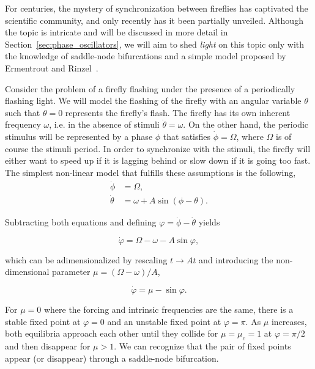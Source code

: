 \begin{exmp}
    For centuries, the mystery of synchronization between fireflies has
    captivated the scientific community, and only recently has it been
    partially unveiled. Although the topic is intricate and will be discussed
    in more detail in Section~\ref{sec:phase_oscillators},
    we will aim to shed {\em light} on this topic only with the knowledge of saddle-node bifurcations
    and a simple model proposed by Ermentrout and Rinzel~\cite{ermentrout1984beyond}. 
    
    Consider the problem
    of a firefly flashing under the presence of a periodically flashing light.
    We will model the flashing of the firefly with an angular variable $\theta$
    such that $\theta = 0$ represents the firefly's flash. The firefly has its 
    own inherent frequency $\omega$, i.e. in the absence of stimuli 
    $\dot{\theta} = \omega$. On the other hand, the periodic stimulus will be
    represented by a phase $\phi$ that satisfies $\dot{\phi} = \Omega$, where 
    $\Omega$ is of course the stimuli period. In order to synchronize with the
    stimuli, the firefly will either want to speed up if it is lagging behind
    or slow down if it is going too fast. The simplest non-linear model that
    fulfills these assumptions is the following,
    \begin{align*}
        \dot{\phi} &= \Omega, \\
        \dot{\theta} &= \omega + A \sin(\phi -  \theta).
    \end{align*}

    Subtracting both equations and defining $\varphi = \dot{\phi} - \dot{\theta}$
    yields 

    \begin{equation*}
        \dot{\varphi} = \Omega - \omega - A \sin \varphi,
    \end{equation*}

    \noindent which can be adimensionalized by rescaling $t \to At$ and introducing
    the non-dimensional parameter $\mu = (\Omega - \omega)/A$,

    \begin{equation}
        \dot{\varphi} = \mu - \sin \varphi.
        \label{eq:pre_bif_sn_exmp}
    \end{equation}

    For $\mu = 0$ where the forcing and intrinsic frequencies are the same, there
    is a stable fixed point at $\varphi = 0$ and an unstable fixed point at $\varphi = \pi$.
    As $\mu$ increases, both equilibria approach each other until they collide for $\mu=\mu_c=1$
    at $\varphi = \pi/2$
    and then disappear for $\mu > 1$. We can recognize that the pair of fixed
    points appear (or disappear) through a saddle-node bifurcation.
    

\end{exmp}
